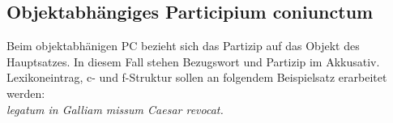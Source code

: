 \documentclass[12pt,a4paper]{article}
\begin{document}

\subsection{Objektabhängiges Participium coniunctum}
Beim objektabhänigen PC bezieht sich das Partizip auf das Objekt des Hauptsatzes. In diesem Fall stehen Bezugswort und Partizip im Akkusativ. \\
Lexikoneintrag, c- und f-Struktur sollen an folgendem Beispielsatz erarbeitet werden: \\
\textit{legatum in Galliam missum Caesar revocat.}
\end{document}
